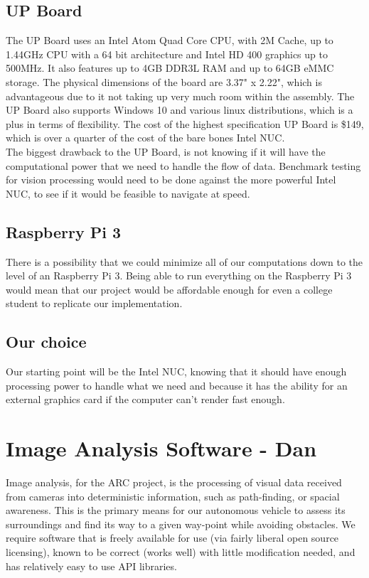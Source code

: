 \documentclass[compsoc,draftclsnofoot,onecolumn,10pt]{IEEEtran}
\begin{document}
\subsection{UP Board}
The UP Board uses an Intel Atom Quad Core CPU, with 2M Cache, up to 1.44GHz CPU with a 64 bit architecture and Intel HD 400 graphics up to 500MHz. 
It also features up to 4GB DDR3L RAM and up to 64GB eMMC storage. 
The physical dimensions of the board are 3.37" x 2.22", which is advantageous due to it not taking up very much room within the assembly. 
The UP Board also supports Windows 10 and various linux distributions, which is a plus in terms of flexibility. 
The cost of the highest specification UP Board is \$149, which is over a quarter of the cost of the bare bones Intel NUC. \\
The biggest drawback to the UP Board, is not knowing if it will have the computational power that we need to handle the flow of data. 
Benchmark testing for vision processing would need to be done against the more powerful Intel NUC, to see if it would be feasible to navigate at speed. 

\subsection{Raspberry Pi 3}
There is a possibility that we could minimize all of our computations down to the level of an Raspberry Pi 3. 
Being able to run everything on the Raspberry Pi 3 would mean that our project would be affordable enough for even a college student to replicate our implementation. 

\subsection{Our choice}
Our starting point will be the Intel NUC, knowing that it should have enough processing power to handle what we need and because it has the ability for an external graphics card if the computer can't render fast enough. 


\newpage

\section{Image Analysis Software - Dan}
Image analysis, for the ARC project, is the processing of visual data received
from cameras into deterministic information, such as path-finding, or spacial
awareness. This is the primary means for our autonomous vehicle to assess its
surroundings and find its way to a given way-point while avoiding obstacles. We
require software that is freely available for use (via fairly liberal open
source licensing), known to be correct (works well) with little modification
needed, and has relatively easy to use API libraries.
\end{document}
